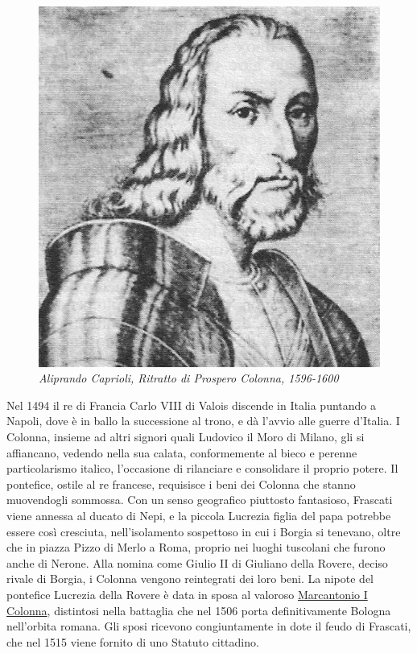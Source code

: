 \documentclass[
  letterpaper,
  DIV=11,
  numbers=noendperiod]{scrartcl}
\begin{document}
\begin{figure}[H]

{\centering \includegraphics{../../images/2024/san_rocco/Prospero_Colonna.jpg}

}

\caption{\emph{Aliprando Caprioli, Ritratto di Prospero Colonna,
1596-1600}}

\end{figure}%

Nel 1494 il re di Francia Carlo VIII di Valois discende in Italia
puntando a Napoli, dove è in ballo la successione al trono, e dà l'avvio
alle guerre d'Italia. I Colonna, insieme ad altri signori quali Ludovico
il Moro di Milano, gli si affiancano, vedendo nella sua calata,
conformemente al bieco e perenne particolarismo italico, l'occasione di
rilanciare e consolidare il proprio potere. Il pontefice, ostile al re
francese, requisisce i beni dei Colonna che stanno muovendogli sommossa.
Con un senso geografico piuttosto fantasioso, Frascati viene annessa al
ducato di Nepi, e la piccola Lucrezia figlia del papa potrebbe essere
così cresciuta, nell'isolamento sospettoso in cui i Borgia si tenevano,
oltre che in piazza Pizzo di Merlo a Roma, proprio nei luoghi tuscolani
che furono anche di Nerone. Alla nomina come Giulio II di Giuliano della
Rovere, deciso rivale di Borgia, i Colonna vengono reintegrati dei loro
beni. La nipote del pontefice Lucrezia della Rovere è data in sposa al
valoroso \hyperref[0]{Marcantonio I Colonna}, distintosi nella battaglia
che nel 1506 porta definitivamente Bologna nell'orbita romana. Gli sposi
ricevono congiuntamente in dote il feudo di Frascati, che nel 1515 viene
fornito di uno Statuto cittadino.
\end{document}

